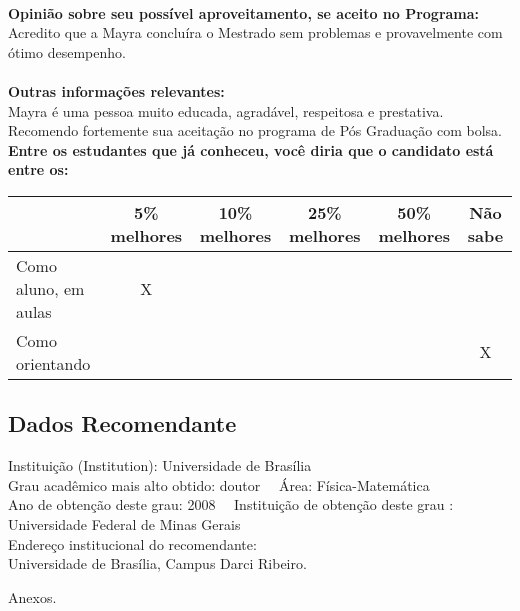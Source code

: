 \documentclass[11pt]{article}
\begin{document}
\\
\textbf{Opinião sobre seu possível aproveitamento, se aceito no Programa:}
\\Acredito que a Mayra concluíra o Mestrado sem problemas e provavelmente com ótimo desempenho.\\ 
\\
\textbf{Outras informações relevantes:} \\Mayra é uma pessoa muito educada, agradável, respeitosa e prestativa.
Recomendo fortemente sua aceitação no programa de Pós Graduação com bolsa.
\\[0.3cm]
\textbf{Entre os estudantes que já conheceu, você diria que o candidato está entre os:}
\\
\begin{tabular}{|l|c|c|c|c|c|}
\hline
 & 5\% melhores & 10\% melhores & 25\% melhores & 50\% melhores & Não sabe \\
\hline
Como aluno, em aulas & X &  &  &  & \\
\hline
Como orientando &  &  &  &  & X\\
\hline
\end{tabular}
\subsection*{Dados Recomendante} 
	Instituição (Institution): Universidade de Brasília
\\ 
	Grau acadêmico mais alto obtido: doutor
	\ \ Área: Física-Matemática
	\\
	Ano de obtenção deste grau: 2008
	\ \ 
	Instituição de obtenção deste grau : Universidade Federal de Minas Gerais
	\\ 
	Endereço institucional do recomendante: \\ Universidade de Brasília, Campus Darci Ribeiro. 
\begin{center}
Anexos.
\end{center}
\end{document}
